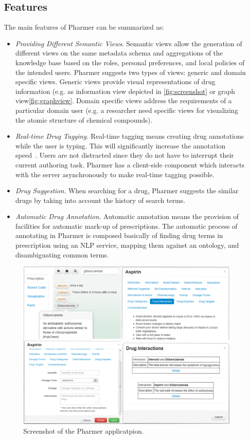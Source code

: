 \documentclass[conference]{IEEEtran}
\begin{document}
\subsection{Features}
The main features of Pharmer can be summarized as:
\begin{itemize}
	\item \emph{Providing Different Semantic Views}.
	Semantic views allow the generation of different views on the same metadata schema and aggregations of the knowledge base based on the roles, personal preferences, and local policies of the intended users.
	Pharmer suggests two types of views: generic and domain specific views.
	Generic views provide visual representations of drug information (e.g. as information view depicted in \autoref{fig:screenshot} or graph view\autoref{fig:graphview}.
	Domain specific views address the requirements of a particular domain user (e.g. a researcher need specific views for visualizing the atomic structure of chemical compounds).
	\item \emph{Real-time Drug Tagging.}
	Real-time tagging means creating drug annotations while the user is typing.
	This will significantly increase the annotation speed~\cite{OCA}.
	Users are not distracted since they do not have to interrupt their current authoring task.
	Pharmer has a client-side component which interacts with the server asynchronously to make real-time tagging possible.
	\item \emph{Drug Suggestion.}
		When searching for a drug, Pharmer suggests the similar drugs by taking into account the history of search terms.
    \item \emph{Automatic Drug Annotation.}
    Automatic annotation means the provision of facilities for automatic mark-up of prescriptions.
    The automatic process of annotating in Pharmer is composed basically of finding drug terms in prescription using an NLP service, mapping them against an ontology, and disambiguating common terms.
\end{itemize}



\begin{figure}[tb]
	\centering
		\includegraphics[width=1\textwidth]{../images/screenshot1.jpg}
	\caption{Screenshot of the Pharmer applicatpion.}
	\label{fig:screenshot}
\end{figure}
\end{document}
